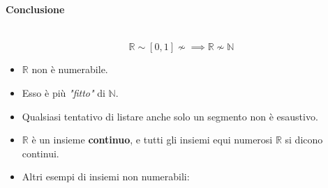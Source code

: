 \documentclass{article}
\begin{document}
\paragraph{Conclusione}\mbox{}\\
$$\mathbb{R}\sim[0,1]\nsim\implies\mathbb{R}\nsim\mathbb{N}$$
\begin{itemize}
    \item $\mathbb{R}$ non è numerabile.
    \item Esso è più \textit{"fitto"} di $\mathbb{N}$.
    \item Qualsiasi tentativo di listare anche solo un segmento non è esaustivo.
    \item $\mathbb{R}$ è un insieme \textbf{continuo}, e tutti gli insiemi equi numerosi
          $\mathbb{R}$ si dicono continui.
    \item Altri esempi di insiemi non numerabili:
\end{itemize}
\end{document}
